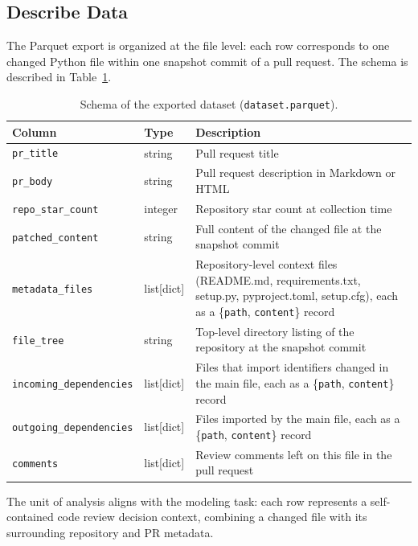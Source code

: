 \documentclass[11pt]{article}
\begin{document}
\subsection*{Describe Data}

The Parquet export is organized at the file level: each row corresponds to one changed Python file within one snapshot commit of a pull request. The schema is described in Table~\ref{tab:schema}.

\begin{table}[H]
\centering
\caption{Schema of the exported dataset (\texttt{dataset.parquet}).}
\label{tab:schema}
\begin{tabular}{@{}p{4.2cm}p{2.5cm}p{7cm}@{}}
\toprule
\textbf{Column} & \textbf{Type} & \textbf{Description} \\ \midrule
\texttt{pr\_title} & string & Pull request title \\ \midrule
\texttt{pr\_body} & string & Pull request description in Markdown or HTML \\ \midrule
\texttt{repo\_star\_count} & integer & Repository star count at collection time \\ \midrule
\texttt{patched\_content} & string & Full content of the changed file at the snapshot commit \\ \midrule
\texttt{metadata\_files} & list[dict] & Repository-level context files (README.md, requirements.txt, setup.py, pyproject.toml, setup.cfg), each as a \{\texttt{path}, \texttt{content}\} record \\ \midrule
\texttt{file\_tree} & string & Top-level directory listing of the repository at the snapshot commit \\ \midrule
\texttt{incoming\_dependencies} & list[dict] & Files that import identifiers changed in the main file, each as a \{\texttt{path}, \texttt{content}\} record \\ \midrule
\texttt{outgoing\_dependencies} & list[dict] & Files imported by the main file, each as a \{\texttt{path}, \texttt{content}\} record \\ \midrule
\texttt{comments} & list[dict] & Review comments left on this file in the pull request \\ \bottomrule
\end{tabular}
\end{table}

The unit of analysis aligns with the modeling task: each row represents a self-contained code review decision context, combining a changed file with its surrounding repository and PR metadata.
\end{document}
